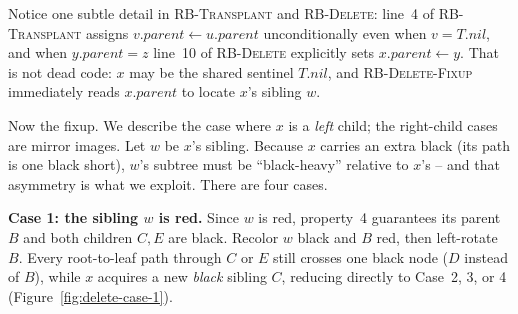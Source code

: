 Notice one subtle detail in \textsc{RB-Transplant} and \textsc{RB-Delete}: line~4
of \textsc{RB-Transplant} assigns $v.\mathit{parent} \gets u.\mathit{parent}$
unconditionally even when $v = T.\mathit{nil}$, and when $y.\mathit{parent} = z$
line~10 of \textsc{RB-Delete} explicitly sets $x.\mathit{parent} \gets y$. That is
not dead code: $x$ may be the shared sentinel $T.\mathit{nil}$, and
\textsc{RB-Delete-Fixup} immediately reads $x.\mathit{parent}$ to locate $x$'s
sibling $w$.

Now the fixup. We describe the case where $x$ is a \emph{left} child; the
right-child cases are mirror images. Let $w$ be $x$'s sibling. Because $x$ carries
an extra black (its path is one black short), $w$'s subtree must be ``black-heavy''
relative to $x$'s -- and that asymmetry is what we exploit. There are four cases.

\textbf{Case 1: the sibling $w$ is red.} Since $w$ is red, property~4 guarantees
its parent $B$ and both children $C, E$ are black. Recolor $w$ black and $B$ red,
then left-rotate $B$. Every root-to-leaf path through $C$ or $E$ still crosses one
black node ($D$ instead of $B$), while $x$ acquires a new \emph{black} sibling $C$,
reducing directly to Case~2, 3, or 4 (Figure~\ref{fig:delete-case-1}).

